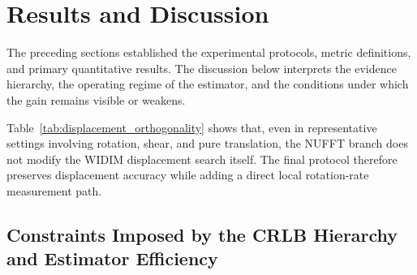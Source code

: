 \documentclass[lettersize,journal]{IEEEtran}
\begin{document}
\section{Results and Discussion}
\label{sec:results-discussion}

The preceding sections established the experimental protocols, metric definitions, and primary quantitative results.
The discussion below interprets the evidence hierarchy, the operating regime of the estimator,
and the conditions under which the gain remains visible or weakens.

\begin{table}[!t]
  \renewcommand{\arraystretch}{1.15}
  \caption{Displacement Orthogonality Check of WIDIM+NUFFT}
  \label{tab:displacement_orthogonality}
  \centering
  \footnotesize
  \setlength{\tabcolsep}{3pt}
\end{table}

Table~\ref{tab:displacement_orthogonality} shows that, even in representative settings involving rotation, shear, and pure translation, the NUFFT branch does not modify the WIDIM displacement search itself. The final protocol therefore preserves displacement accuracy while adding a direct local rotation-rate measurement path.

\subsection{Constraints Imposed by the CRLB Hierarchy and Estimator Efficiency}
\end{document}
